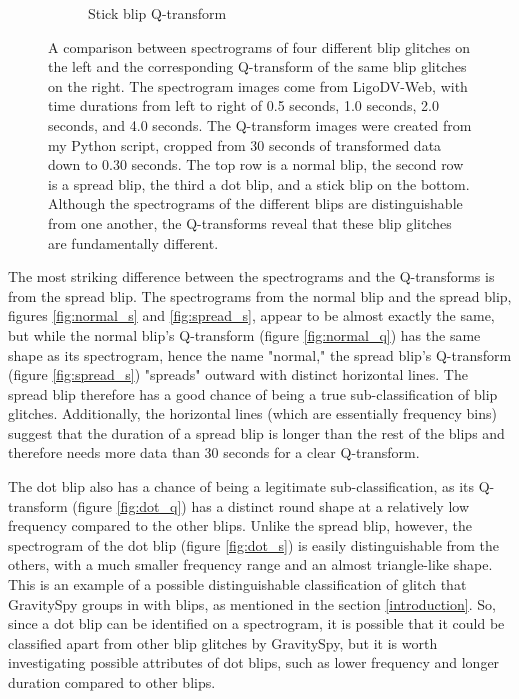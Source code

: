 \documentclass[a4paper]{article}
\begin{document}
\begin{figure}[h!]
\begin{subfigure}[t]{.29\textwidth}
		\caption{Stick blip Q-transform}
		\label{fig:stick_q}
	\end{subfigure}
	\caption{A comparison between spectrograms of four different blip glitches on the left and the corresponding Q-transform of the same blip glitches on the right. The spectrogram images come from LigoDV-Web, with time durations from left to right of 0.5 seconds, 1.0 seconds, 2.0 seconds, and 4.0 seconds. The Q-transform images were created from my Python script, cropped from 30 seconds of transformed data down to 0.30 seconds. The top row is a normal blip, the second row is a spread blip, the third a dot blip, and a stick blip on the bottom. Although the spectrograms of the different blips are distinguishable from one another, the Q-transforms reveal that these blip glitches are fundamentally different.}
	\label{fig:comparison}
\end{figure}

The most striking difference between the spectrograms and the Q-transforms is from the spread blip. The spectrograms from the normal blip and the spread blip, figures \ref{fig:normal_s} and \ref{fig:spread_s}, appear to be almost exactly the same, but while the normal blip's Q-transform (figure \ref{fig:normal_q}) has the same shape as its spectrogram, hence the name "normal," the spread blip's Q-transform (figure \ref{fig:spread_s}) "spreads" outward with distinct horizontal lines. The spread blip therefore has a good chance of being a true sub-classification of blip glitches. Additionally, the horizontal lines (which are essentially frequency bins) suggest that the duration of a spread blip is longer than the rest of the blips and therefore needs more data than 30 seconds for a clear Q-transform. 

The dot blip also has a chance of being a legitimate sub-classification, as its Q-transform (figure \ref{fig:dot_q}) has a distinct round shape at a relatively low frequency compared to the other blips. Unlike the spread blip, however, the spectrogram of the dot blip (figure \ref{fig:dot_s}) is easily distinguishable from the others, with a much smaller frequency range and an almost triangle-like shape. This is an example of a possible distinguishable classification of glitch that GravitySpy groups in with blips, as mentioned in the section \ref{introduction}. So, since a dot blip can be identified on a spectrogram, it is possible that it could be classified apart from other blip glitches by GravitySpy, but it is worth investigating possible attributes of dot blips, such as lower frequency and longer duration compared to other blips.
\end{document}
